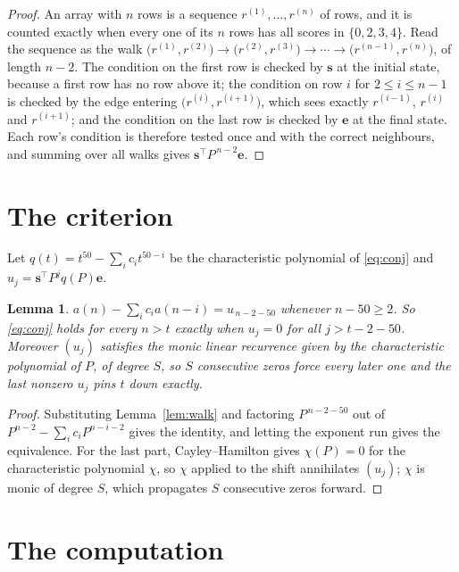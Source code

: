 \documentclass[11pt,a4paper]{article}
\theoremstyle{plain}
\newtheorem{lemma}[theorem]{Lemma}
\theoremstyle{definition}
\begin{document}
\begin{proof}
An array with $n$ rows is a sequence $r^{(1)},\dots,r^{(n)}$ of rows, and it is counted
exactly when every one of its $n$ rows has all scores in $\{0,2,3,4\}$. Read the sequence as the
walk $\bigl(r^{(1)},r^{(2)}\bigr)\to\bigl(r^{(2)},r^{(3)}\bigr)\to\cdots\to
\bigl(r^{(n-1)},r^{(n)}\bigr)$, of length $n-2$. The condition on the first row is
checked by $\mathbf{s}$ at the initial state, because a first row has no row above it; the
condition on row $i$ for $2\le i\le n-1$ is checked by the edge entering
$\bigl(r^{(i)},r^{(i+1)}\bigr)$, which sees exactly $r^{(i-1)}$, $r^{(i)}$ and
$r^{(i+1)}$; and the condition on the last row is checked by $\mathbf{e}$ at the final
state. Each row's condition is therefore tested once and with the correct neighbours, and
summing over all walks gives $\mathbf{s}^{\!\top}P^{\,n-2}\mathbf{e}$.
\end{proof}

\section{The criterion}

Let $q(t)=t^{50}-\sum_i c_i t^{50-i}$ be the characteristic polynomial of
\eqref{eq:conj} and $u_j=\mathbf{s}^{\!\top}P^{j}q(P)\mathbf{e}$.

\begin{lemma}\label{lem:crit}
$a(n)-\sum_i c_i a(n-i)=u_{\,n-2-50}$ whenever $n-50\ge2$. So \eqref{eq:conj}
holds for every $n>t$ exactly when $u_j=0$ for all $j>t-2-50$. Moreover $(u_j)$
satisfies the monic linear recurrence given by the characteristic polynomial of $P$, of
degree $S$, so $S$ consecutive zeros force every later one and the last nonzero $u_j$ pins
$t$ down exactly.
\end{lemma}

\begin{proof}
Substituting Lemma~\ref{lem:walk} and factoring $P^{\,n-2-50}$ out of
$P^{n-2}-\sum_i c_i P^{n-i-2}$ gives the identity, and letting the exponent run gives the
equivalence. For the last part, Cayley--Hamilton gives $\chi(P)=0$ for the characteristic
polynomial $\chi$, so $\chi$ applied to the shift annihilates $(u_j)$; $\chi$ is monic of
degree $S$, which propagates $S$ consecutive zeros forward.
\end{proof}

\section{The computation}
\end{document}
